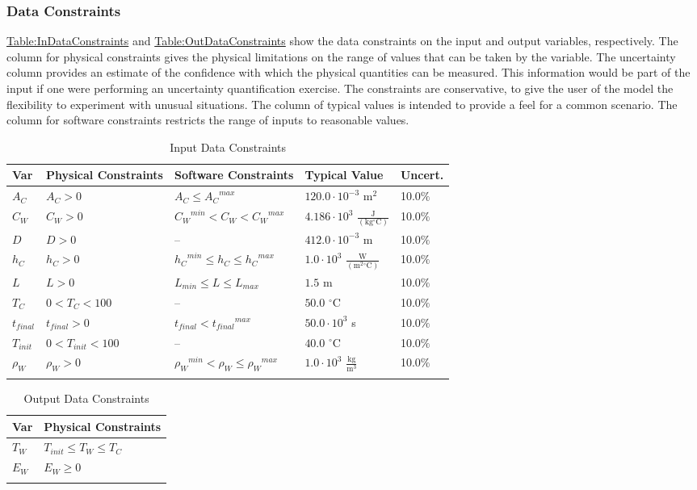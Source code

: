 \documentclass[12pt]{article}
\begin{document}
\subsubsection{Data Constraints}
\label{Sec:DataConstraints}
\hyperref[Table:InDataConstraints]{Table:InDataConstraints} and \hyperref[Table:OutDataConstraints]{Table:OutDataConstraints} show the data constraints on the input and output variables, respectively. The column for physical constraints gives the physical limitations on the range of values that can be taken by the variable. The uncertainty column provides an estimate of the confidence with which the physical quantities can be measured. This information would be part of the input if one were performing an uncertainty quantification exercise. The constraints are conservative, to give the user of the model the flexibility to experiment with unusual situations. The column of typical values is intended to provide a feel for a common scenario. The column for software constraints restricts the range of inputs to reasonable values.
\begin{longtable}{l l l l l}
\toprule
Var & Physical Constraints & Software Constraints & Typical Value & Uncert.
\\
\midrule
${A_{C}}$ & ${A_{C}}>0$ & ${A_{C}}\leq{}{{A_{C}}^{max}}$ & $120.0\cdot{}10^{-3}$ $\text{m}^{2}$ & 10.0$\%$
\\
${C_{W}}$ & ${C_{W}}>0$ & ${{C_{W}}^{min}}<{C_{W}}<{{C_{W}}^{max}}$ & $4.186\cdot{}10^{3}$ $\frac{\text{J}}{(\text{kg}{}^{\circ}\text{C})}$ & 10.0$\%$
\\
$D$ & $D>0$ & -- & $412.0\cdot{}10^{-3}$ m & 10.0$\%$
\\
${h_{C}}$ & ${h_{C}}>0$ & ${{h_{C}}^{min}}\leq{}{h_{C}}\leq{}{{h_{C}}^{max}}$ & $1.0\cdot{}10^{3}$ $\frac{\text{W}}{(\text{m}^{2}{}^{\circ}\text{C})}$ & 10.0$\%$
\\
$L$ & $L>0$ & ${L_{min}}\leq{}L\leq{}{L_{max}}$ & $1.5$ m & 10.0$\%$
\\
${T_{C}}$ & $0<{T_{C}}<100$ & -- & $50.0$ ${}^{\circ}$C & 10.0$\%$
\\
${t_{final}}$ & ${t_{final}}>0$ & ${t_{final}}<{{t_{final}}^{max}}$ & $50.0\cdot{}10^{3}$ s & 10.0$\%$
\\
${T_{init}}$ & $0<{T_{init}}<100$ & -- & $40.0$ ${}^{\circ}$C & 10.0$\%$
\\
${ρ_{W}}$ & ${ρ_{W}}>0$ & ${{ρ_{W}}^{min}}<{ρ_{W}}\leq{}{{ρ_{W}}^{max}}$ & $1.0\cdot{}10^{3}$ $\frac{\text{kg}}{\text{m}^{3}}$ & 10.0$\%$
\\
\bottomrule
\caption{Input Data Constraints}
\label{Table:InDataConstraints}
\end{longtable}
\begin{longtable}{l l}
\toprule
Var & Physical Constraints
\\
\midrule
${T_{W}}$ & ${T_{init}}\leq{}{T_{W}}\leq{}{T_{C}}$
\\
${E_{W}}$ & ${E_{W}}\geq{}0$
\\
\bottomrule
\caption{Output Data Constraints}
\label{Table:OutDataConstraints}
\end{longtable}
\end{document}
